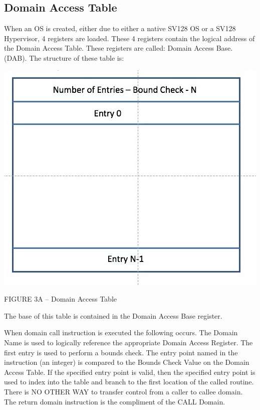 \documentclass{article}
\begin{document}
\subsection{Domain Access Table}

When an OS is created, either due to either a native SV128 OS or a SV128 Hypervisor,  4 registers are loaded.  These 4 registers  contain the logical address of the Domain Access Table.   These registers are called:  Domain Access Base.  (DAB). The structure of  these table is:

\begin{center}
\includegraphics[scale = .4]
{figures/figure3a_table_structure_general.jpg}
\centering
\end{center}

		                 FIGURE 3A – Domain Access Table \newline
		                 
The base of this table is contained in the Domain Access Base register. \newline


		                 
		                 
		                 
		     
		                 
When domain call instruction is executed the following occurs.  The Domain Name is used to logically reference the appropriate Domain Access Register.   The first entry is used to perform a bounds check.  The entry point named  in the instruction (an integer) is compared to the Bounds Check  Value on  the Domain Access Table.  If  the specified entry point is valid,  then   the specified entry  point is used to index into the table and branch to the first location of the called routine.  There is NO OTHER WAY to transfer control from a caller to callee domain. The return domain instruction is the compliment of the CALL Domain.
\end{document}
